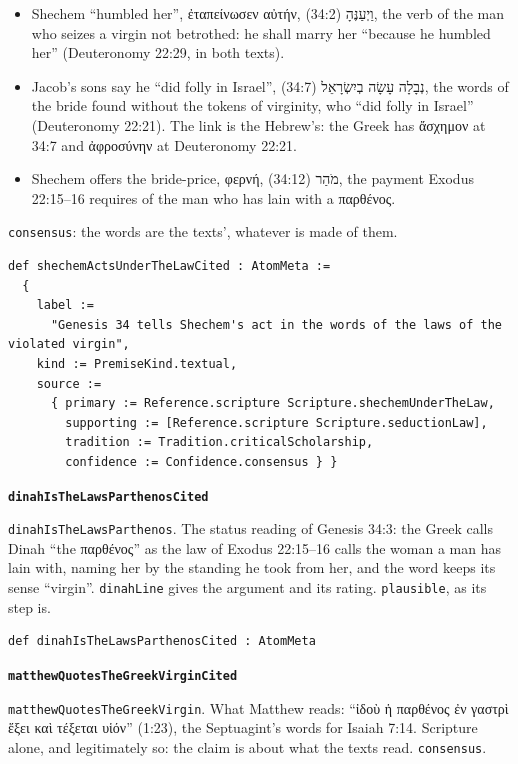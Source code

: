 \documentclass[11pt]{article}
\begin{document}
\begin{itemize}
  \item Shechem “humbled her”, ἐταπείνωσεν αὐτήν, וַיְעַנֶּהָ (34:2), the verb of the man who seizes a virgin not betrothed: he shall marry her “because he humbled her” (Deuteronomy 22:29, in both texts).
  \item Jacob’s sons say he “did folly in Israel”, נְבָלָה עָשָׂה בְיִשְׂרָאֵל (34:7), the words of the bride found without the tokens of virginity, who “did folly in Israel” (Deuteronomy 22:21). The link is the Hebrew’s: the Greek has ἄσχημον at 34:7 and ἀφροσύνην at Deuteronomy 22:21.
  \item Shechem offers the bride-price, φερνή, מֹהַר (34:12), the payment Exodus 22:15–16 requires of the man who has lain with a παρθένος.
\end{itemize}
\texttt{consensus}: the words are the texts’, whatever is made of them.

{\small\begin{verbatim}
def shechemActsUnderTheLawCited : AtomMeta :=
  {
    label :=
      "Genesis 34 tells Shechem's act in the words of the laws of the violated virgin",
    kind := PremiseKind.textual,
    source :=
      { primary := Reference.scripture Scripture.shechemUnderTheLaw,
        supporting := [Reference.scripture Scripture.seductionLaw],
        tradition := Tradition.criticalScholarship,
        confidence := Confidence.consensus } }
\end{verbatim}}
\par\medskip\noindent\textbf{\texttt{dinah\allowbreak{}Is\allowbreak{}The\allowbreak{}Laws\allowbreak{}Parthenos\allowbreak{}Cited}}\par\nobreak\noindent
\texttt{dinah\allowbreak{}Is\allowbreak{}The\allowbreak{}Laws\allowbreak{}Parthenos}. The status reading of Genesis 34:3: the Greek calls Dinah “the παρθένος” as the law of Exodus 22:15–16 calls the woman a man has lain with, naming her by the standing he took from her, and the word keeps its sense “virgin”. \texttt{dinah\allowbreak{}Line} gives the argument and its rating. \texttt{plausible}, as its step is.

{\small\begin{verbatim}
def dinahIsTheLawsParthenosCited : AtomMeta
\end{verbatim}}
\par\medskip\noindent\textbf{\texttt{matthew\allowbreak{}Quotes\allowbreak{}The\allowbreak{}Greek\allowbreak{}Virgin\allowbreak{}Cited}}\par\nobreak\noindent
\texttt{matthew\allowbreak{}Quotes\allowbreak{}The\allowbreak{}Greek\allowbreak{}Virgin}. What Matthew reads: “ἰδοὺ ἡ παρθένος ἐν γαστρὶ ἕξει καὶ τέξεται υἱόν” (1:23), the Septuagint’s words for Isaiah 7:14. Scripture alone, and legitimately so: the claim is about what the texts read. \texttt{consensus}.
\end{document}

